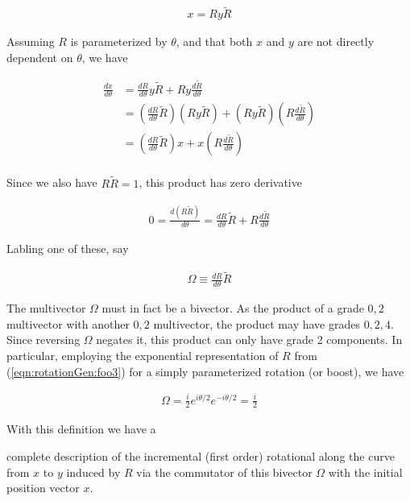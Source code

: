 \begin{align}\label{eqn:rotationGen:foo10}
x = R y \tilde{R} 
\end{align}

Assuming $R$ is parameterized by $\theta$, and that both $x$ and $y$ are not directly dependent on $\theta$, we have

\begin{align*}
\frac{dx}{d\theta} 
&= 
\frac{d R}{d \theta} y \tilde{R} + R y \frac{d \tilde{R} }{d\theta} \\
&= 
\left(\frac{d R}{d \theta} \tilde{R} \right) (R y \tilde{R}) + (R y \tilde{R}) \left( R \frac{d \tilde{R} }{d\theta} \right) \\
&= 
\left(\frac{d R}{d \theta} \tilde{R} \right) x + x \left( R \frac{d \tilde{R} }{d\theta} \right) \\
\end{align*}

Since we also have $R \tilde{R} = 1$, this product has zero derivative

\begin{align*}
0 = \frac{d (R \tilde{R})}{d\theta} = \frac{d R}{d\theta} \tilde{R} + R \frac{d \tilde{R}}{d\theta} 
\end{align*}

Labling one of these, say

\begin{align}\label{eqn:rotationGen:foo11}
\Omega \equiv \frac{d R}{d\theta} \tilde{R} 
\end{align}

The multivector $\Omega$ must in fact be a bivector.  As the product of a grade $0,2$ multivector with another $0,2$ multivector, the product may have grades $0,2,4$.  Since reversing $\Omega$ negates it, this product can only have grade 2 components.  In particular, employing the exponential representation of $R$ from (\ref{eqn:rotationGen:foo3}) for a simply parameterized rotation (or boost), we have

\begin{align}\label{eqn:rotationGen:foo16}
\Omega = \frac{i}{2} e^{i \theta/2} e^{-i \theta/2} = \frac{i}{2}
\end{align}

With this definition we have a 

complete description of the incremental (first order) rotational along the curve from $x$ to $y$ induced by $R$ via the commutator of this bivector $\Omega$ with the initial position vector $x$.


